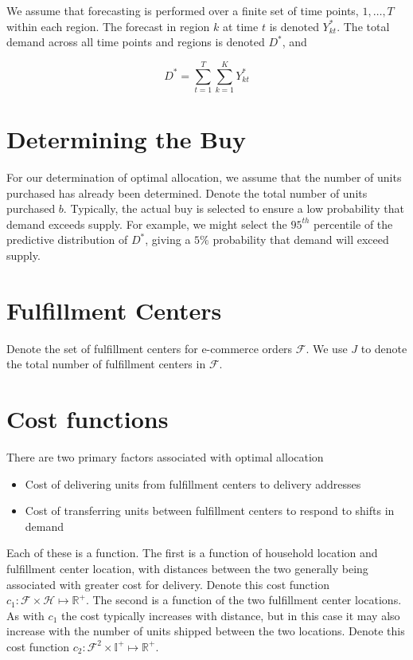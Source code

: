 \documentclass[11pt, oneside]{article}   	%
\begin{document}
\noindent We assume that forecasting is performed over a finite set of time points, $1, \ldots, T$ within each region.  The forecast in region $k$ at time $t$ is denoted $Y_{kt}^*$.  The total demand across all time points and regions is denoted $D^*$, and

$$D^* = \sum_{t = 1}^T \sum_{k = 1}^K Y_{kt}^*$$

\section{Determining the Buy}

For our determination of optimal allocation, we assume that the number of units purchased has already been determined.  Denote the total number of units purchased $b$.  Typically, the actual buy is selected to ensure a low probability that demand exceeds supply.  For example, we might select the $95^{th}$ percentile of the predictive distribution of $D^*$, giving a $5\%$ probability that demand will exceed supply.

\section{Fulfillment Centers}

Denote the set of fulfillment centers for e-commerce orders $\mathcal{F}$.  We use $J$ to denote the total number of fulfillment centers in $\mathcal{F}$.

\section{Cost functions}

There are two primary factors associated with optimal allocation

\begin{itemize}
\item Cost of delivering units from fulfillment centers to delivery addresses
\item Cost of transferring units between fulfillment centers to respond to shifts in demand
\end{itemize}

Each of these is a function.  The first is a function of household location and fulfillment center location, with distances between the two generally being associated with greater cost for delivery.  Denote this cost function $c_1 \colon \mathcal{F} \times \mathcal{H} \mapsto \mathbb{R}^+$.  The second is a function of the two fulfillment center locations.  As with $c_1$ the cost typically increases with distance, but in this case it may also increase with the number of units shipped between the two locations.  Denote this cost function $c_2 \colon \mathcal{F}^2 \times \mathbb{I}^+ \mapsto \mathbb{R}^+$.
\end{document}
